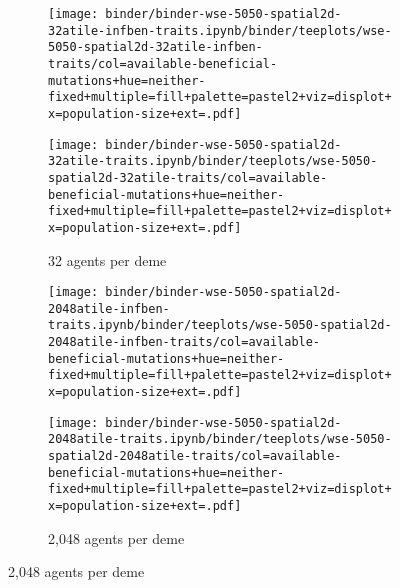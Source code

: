 \begin{figure}[h]
    \begin{subfigure}[b]{\linewidth}
        \begin{minipage}{\textwidth}
          \texttt{[image: binder/binder-wse-5050-spatial2d-32atile-infben-traits.ipynb/binder/teeplots/wse-5050-spatial2d-32atile-infben-traits/col=available-beneficial-mutations+hue=neither-fixed+multiple=fill+palette=pastel2+viz=displot+x=population-size+ext=.pdf]}

          \texttt{[image: binder/binder-wse-5050-spatial2d-32atile-traits.ipynb/binder/teeplots/wse-5050-spatial2d-32atile-traits/col=available-beneficial-mutations+hue=neither-fixed+multiple=fill+palette=pastel2+viz=displot+x=population-size+ext=.pdf]}%
        \end{minipage}
        \begin{minipage}{\textwidth}
        \caption{32 agents per deme}
        \label{fig:neither-fixed-5050-wse:32}
        \end{minipage}%
    \end{subfigure}

\begin{subfigure}[b]{\linewidth}
    \begin{minipage}{\textwidth}
      \texttt{[image: binder/binder-wse-5050-spatial2d-2048atile-infben-traits.ipynb/binder/teeplots/wse-5050-spatial2d-2048atile-infben-traits/col=available-beneficial-mutations+hue=neither-fixed+multiple=fill+palette=pastel2+viz=displot+x=population-size+ext=.pdf]}

      \texttt{[image: binder/binder-wse-5050-spatial2d-2048atile-traits.ipynb/binder/teeplots/wse-5050-spatial2d-2048atile-traits/col=available-beneficial-mutations+hue=neither-fixed+multiple=fill+palette=pastel2+viz=displot+x=population-size+ext=.pdf]}%
    \end{minipage}
    \begin{minipage}{\textwidth}
    \caption{2,048 agents per deme}
    \label{fig:neither-fixed-5050-wse:2048}
    \end{minipage}%
\end{subfigure}



\end{figure}
